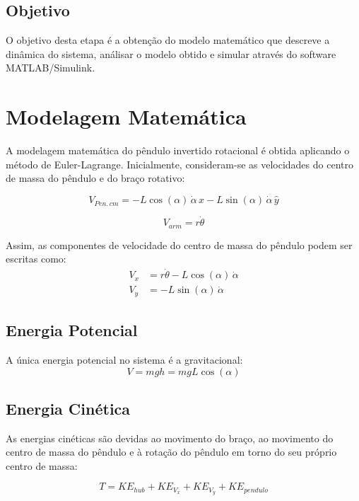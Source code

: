 \documentclass[9pt,a4paper,twocolumn,twoside]{tau-class/tau}
\begin{document}
\subsection{Objetivo}
O objetivo desta etapa é a obtenção do modelo matemático que descreve a dinâmica do sistema, 
análisar o modelo obtido e simular através do software MATLAB/Simulink.

\section{Modelagem Matemática}

A modelagem matemática do pêndulo invertido rotacional é obtida aplicando o 
método de Euler-Lagrange. Inicialmente, consideram-se as velocidades do 
centro de massa do pêndulo e do braço rotativo:

\begin{equation}
    V_{Pen.\,cm} = -L \cos (\alpha) \, \dot{\alpha} \, \hat{x} - L \sin (\alpha) \, \dot{\alpha} \, \hat{y}
\end{equation}

\begin{equation}
    V_{arm} = r \dot{\theta}
\end{equation}

Assim, as componentes de velocidade do centro de massa do pêndulo podem ser escritas como:
\begin{align}
    V_x &= r\dot{\theta} - L\cos(\alpha) \, \dot{\alpha} \\
    V_y &= -L\sin(\alpha) \, \dot{\alpha}
\end{align}

\subsection{Energia Potencial}
A única energia potencial no sistema é a gravitacional:
\begin{equation}
    V = m g h = m g L \cos(\alpha)
\end{equation}

\subsection{Energia Cinética}
As energias cinéticas são devidas ao movimento do braço, ao movimento do centro 
de massa do pêndulo e à rotação do pêndulo em torno do seu próprio centro de massa:

\begin{equation}
    T = KE_{hub} + KE_{V_x} + KE_{V_y} + KE_{pendulo}
\end{equation}
\end{document}

